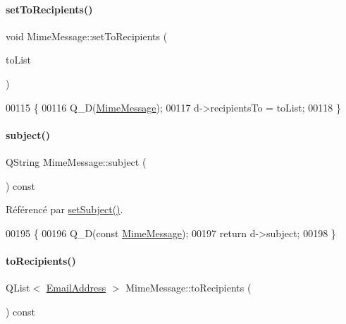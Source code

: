 \paragraph{\texorpdfstring{set\+To\+Recipients()}{setToRecipients()}}
{\footnotesize\ttfamily void Mime\+Message\+::set\+To\+Recipients (\begin{DoxyParamCaption}\item[{const Q\+List$<$ \hyperlink{class_simple_mail_1_1_email_address}{Email\+Address} $>$ \&}]{to\+List }\end{DoxyParamCaption})}


\begin{DoxyCode}
00115 \{
00116     Q\_D(\hyperlink{class_simple_mail_1_1_mime_message}{MimeMessage});
00117     d->recipientsTo = toList;
00118 \}
\end{DoxyCode}
\mbox{\label{class_simple_mail_1_1_mime_message_a54274861ea83b4b37dd9db80aca34e39}} 
\paragraph{\texorpdfstring{subject()}{subject()}}
{\footnotesize\ttfamily Q\+String Mime\+Message\+::subject (\begin{DoxyParamCaption}{ }\end{DoxyParamCaption}) const}



Référencé par \hyperlink{class_simple_mail_1_1_mime_message_a525c33895b322e06c35c0d831cfe9b02}{set\+Subject()}.


\begin{DoxyCode}
00195 \{
00196     Q\_D(\textcolor{keyword}{const} \hyperlink{class_simple_mail_1_1_mime_message}{MimeMessage});
00197     \textcolor{keywordflow}{return} d->subject;
00198 \}
\end{DoxyCode}
\mbox{\label{class_simple_mail_1_1_mime_message_a1e3c4cf44d48b95f8436d251d19ffcb2}} 
\paragraph{\texorpdfstring{to\+Recipients()}{toRecipients()}}
{\footnotesize\ttfamily Q\+List$<$ \hyperlink{class_simple_mail_1_1_email_address}{Email\+Address} $>$ Mime\+Message\+::to\+Recipients (\begin{DoxyParamCaption}{ }\end{DoxyParamCaption}) const}



